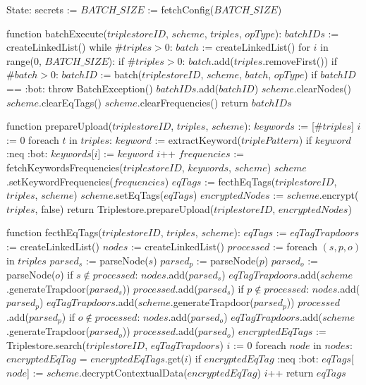 State:
    secrets := {}
    $BATCH\_SIZE$ := fetchConfig($BATCH\_SIZE$)

function batchExecute($triplestoreID$, $scheme$, $triples$, $opType$):
    $batchIDs$ := createLinkedList()
    while $\#triples > 0$: 
        $batch$ := createLinkedList()
        for $i$ in range(0, $BATCH\_SIZE$):
            if $\#triples > 0$:
                $batch$.add($triples$.removeFirst())
        if $\#batch > 0$:
            $batchID$ := batch($triplestoreID$, $scheme$, $batch$, $opType$)
            if $batchID$ == :bot:
                throw BatchException()
            $batchIDs$.add($batchID$)
        $scheme$.clearNodes()
        $scheme$.clearEqTags()
    $scheme$.clearFrequencies()
    return $batchIDs$
        
function prepareUpload($triplestoreID$, $triples$, $scheme$):
    $keywords$ := [$\#triples$]
    $i$ := 0
    foreach $t$ in $triples$:
        $keyword$ := extractKeyword($triplePattern$) 
        if $keyword$ :neq :bot:
            $keywords$[$i$] := $keyword$
            $i$++
    $frequencies$ := fetchKeywordsFrequencies($triplestoreID$, $keywords$, $scheme$)
    $scheme$.setKeywordFrequencies($frequencies$)
    $eqTags$ := fecthEqTags($triplestoreID$, $triples$, $scheme$)
    $scheme$.setEqTags($eqTags$)
    $encryptedNodes$ := $scheme$.encrypt($triples$, false)
    return Triplestore.prepareUpload($triplestoreID$, $encryptedNodes$)

function fecthEqTags($triplestoreID$, $triples$, $scheme$):
    $eqTags$ := {}
    $eqTagTrapdoors$ := createLinkedList()
    $nodes$ := createLinkedList()
    $processed$ := {}
    foreach $(s, p, o)$ in $triples$
        $parsed_s$ := parseNode($s$)
        $parsed_p$ := parseNode($p$)
        $parsed_o$ := parseNode($o$)
        if $s \notin processed$:
            $nodes$.add($parsed_s$)
            $eqTagTrapdoors$.add($scheme$.generateTrapdoor($parsed_s$))
            $processed$.add($parsed_s$)
        if $p \notin processed$:
            $nodes$.add($parsed_p$)
            $eqTagTrapdoors$.add($scheme$.generateTrapdoor($parsed_p$))
            $processed$.add($parsed_p$)
        if $o \notin processed$:
            $nodes$.add($parsed_o$)
            $eqTagTrapdoors$.add($scheme$.generateTrapdoor($parsed_o$))
            $processed$.add($parsed_o$)
    $encryptedEqTags$ := Triplestore.search($triplestoreID$, $eqTagTrapdoors$)
    $i$ := 0
    foreach $node$ in $nodes$:
        $encryptedEqTag$ = $encryptedEqTags$.get($i$)
        if $encryptedEqTag$ :neq :bot:
            $eqTags$[$node$] := $scheme$.decryptContextualData($encryptedEqTag$)
        $i$++
    return $eqTags$

